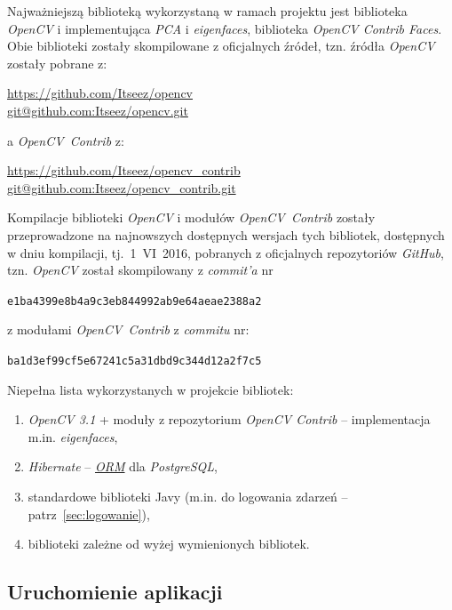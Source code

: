 \documentclass[a4paper,titlepage]{article}
\theoremstyle{break}
\numberwithin{equation}{subsection}
\begin{document}
Najważniejszą biblioteką wykorzystaną w ramach projektu jest biblioteka \emph{OpenCV} i implementująca \emph{PCA} i \emph{eigenfaces}, biblioteka \emph{OpenCV Contrib Faces}. Obie biblioteki zostały skompilowane z oficjalnych źródeł, tzn. źródła \emph{OpenCV} zostały pobrane z:
\begin{center}
\url{https://github.com/Itseez/opencv}\\
\url{git@github.com:Itseez/opencv.git}
\end{center}
a \emph{OpenCV~Contrib} z:
\begin{center}
\url{https://github.com/Itseez/opencv_contrib}\\
\url{git@github.com:Itseez/opencv_contrib.git}
\end{center}
Kompilacje biblioteki \emph{OpenCV} i modułów \emph{OpenCV~Contrib} zostały przeprowadzone na najnowszych dostępnych wersjach tych bibliotek, dostępnych w dniu kompilacji, tj.~1~VI~2016, pobranych z oficjalnych repozytoriów \emph{GitHub}, tzn. \emph{OpenCV} został skompilowany z \emph{commit'a} nr
\begin{center}
\texttt{e1ba4399e8b4a9c3eb844992ab9e64aeae2388a2}
\end{center}
z modułami \emph{OpenCV~Contrib} z \emph{commitu} nr:
\begin{center}
\texttt{ba1d3ef99cf5e67241c5a31dbd9c344d12a2f7c5}
\end{center}

Niepełna lista wykorzystanych w projekcie bibliotek:
\begin{enumerate}
	\item \emph{OpenCV 3.1} + moduły z repozytorium \emph{OpenCV Contrib} -- implementacja m.in. \emph{eigenfaces},
	\item \emph{Hibernate} -- \href{https://en.wikipedia.org/wiki/Object-relational_mapping}{\emph{ORM}} dla \emph{PostgreSQL},
	\item standardowe biblioteki Javy (m.in. do logowania zdarzeń -- patrz~\ref{sec:logowanie}),
	\item biblioteki zależne od wyżej wymienionych bibliotek.
\end{enumerate}


\subsection{Uruchomienie aplikacji}
\end{document}
